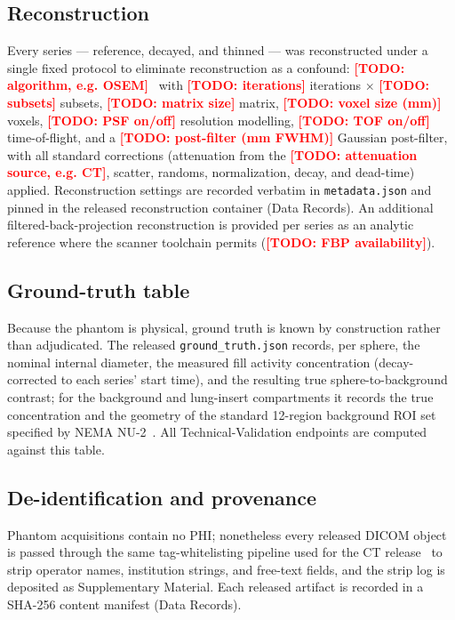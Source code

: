 \documentclass[twoside,11pt]{article}
\newcommand{\todo}[1]{\textcolor{red}{\textbf{[TODO: #1]}}}
\begin{document}
\subsection*{Reconstruction}

Every series --- reference, decayed, and thinned --- was reconstructed under a
single fixed protocol to eliminate reconstruction as a confound:
\todo{algorithm, e.g. OSEM}~\citep{hudson1994osem} with \todo{iterations}
iterations $\times$ \todo{subsets} subsets, \todo{matrix size} matrix,
\todo{voxel size (mm)} voxels, \todo{PSF on/off} resolution modelling,
\todo{TOF on/off} time-of-flight, and a \todo{post-filter (mm FWHM)} Gaussian
post-filter, with all standard corrections (attenuation from the
\todo{attenuation source, e.g. CT}, scatter, randoms, normalization, decay, and
dead-time) applied. Reconstruction settings are recorded verbatim in
\texttt{metadata.json} and pinned in the released reconstruction container
(Data Records). An additional filtered-back-projection reconstruction is provided
per series as an analytic reference where the scanner toolchain permits
(\todo{FBP availability}).

\subsection*{Ground-truth table}

Because the phantom is physical, ground truth is known by construction rather than
adjudicated. The released \texttt{ground\_truth.json} records, per sphere, the
nominal internal diameter, the measured fill activity concentration (decay-corrected
to each series' start time), and the resulting true sphere-to-background contrast;
for the background and lung-insert compartments it records the true concentration
and the geometry of the standard 12-region background ROI set specified by NEMA
NU-2~\citep{nema_nu2}. All Technical-Validation endpoints are computed against this
table.

\subsection*{De-identification and provenance}

Phantom acquisitions contain no PHI; nonetheless every released DICOM object is
passed through the same tag-whitelisting pipeline used for the CT
release~\citep{ws1dataset} to strip operator names, institution strings, and free-text
fields, and the strip log is deposited as Supplementary Material. Each released
artifact is recorded in a SHA-256 content manifest (Data Records).
\end{document}
